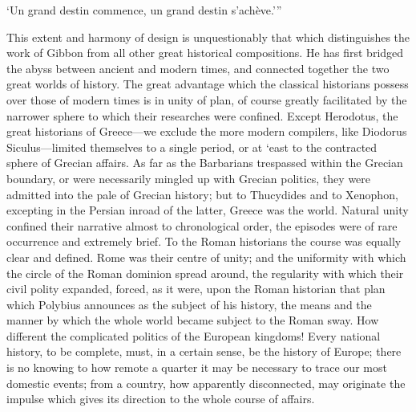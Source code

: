 ‘Un grand destin commence, un grand destin s’achève.’”

This extent and harmony of design is unquestionably that which distinguishes
the work of Gibbon from all other great historical compositions. He has
first bridged the abyss between ancient and modern times, and connected
together the two great worlds of history. The great advantage which the
classical historians possess over those of modern times is in unity of plan,
of course greatly facilitated by the narrower sphere to which their
researches were confined. Except Herodotus, the great historians of
Greece—we exclude the more modern compilers, like Diodorus Siculus—limited
themselves to a single period, or at ‘east to the contracted sphere of
Grecian affairs. As far as the Barbarians trespassed within the Grecian
boundary, or were necessarily mingled up with Grecian politics, they were
admitted into the pale of Grecian history; but to Thucydides and to Xenophon,
excepting in the Persian inroad of the latter, Greece was the world. Natural
unity confined their narrative almost to chronological order, the episodes
were of rare occurrence and extremely brief. To the Roman historians the
course was equally clear and defined. Rome was their centre of unity; and
the uniformity with which the circle of the Roman dominion spread around,
the regularity with which their civil polity expanded, forced, as it were,
upon the Roman historian that plan which Polybius announces as the subject
of his history, the means and the manner by which the whole world became
subject to the Roman sway. How different the complicated politics of the
European kingdoms! Every national history, to be complete, must, in a
certain sense, be the history of Europe; there is no knowing to how remote
a quarter it may be necessary to trace our most domestic events; from a
country, how apparently disconnected, may originate the impulse which gives
its direction to the whole course of affairs.

